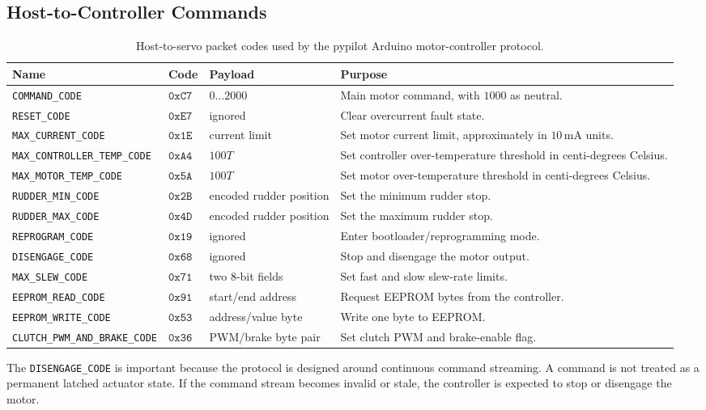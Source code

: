 \documentclass[10pt,twocolumn]{article}
\begin{document}
\subsection{Host-to-Controller Commands}
\begin{table}[!tbp]
\centering
\caption{Host-to-servo packet codes used by the pypilot Arduino motor-controller protocol.}
\label{tab:pypilot-servo-host-codes}
\begin{tabularx}{\textwidth}{Z{0.24\textwidth}Z{0.10\textwidth}Z{0.20\textwidth}Y}
\toprule
Name & Code & Payload & Purpose \\
\midrule
\texttt{COMMAND\_CODE} &
\(\mathtt{0xC7}\) &
\(0\ldots 2000\) &
Main motor command, with \(1000\) as neutral. \\
\texttt{RESET\_CODE} &
\(\mathtt{0xE7}\) &
ignored &
Clear overcurrent fault state. \\
\texttt{MAX\_CURRENT\_CODE} &
\(\mathtt{0x1E}\) &
current limit &
Set motor current limit, approximately in \(10\,\mathrm{mA}\) units. \\
\texttt{MAX\_CONTROLLER\_TEMP\_CODE} &
\(\mathtt{0xA4}\) &
\(100T\) &
Set controller over-temperature threshold in centi-degrees Celsius. \\
\texttt{MAX\_MOTOR\_TEMP\_CODE} &
\(\mathtt{0x5A}\) &
\(100T\) &
Set motor over-temperature threshold in centi-degrees Celsius. \\
\texttt{RUDDER\_MIN\_CODE} &
\(\mathtt{0x2B}\) &
encoded rudder position &
Set the minimum rudder stop. \\
\texttt{RUDDER\_MAX\_CODE} &
\(\mathtt{0x4D}\) &
encoded rudder position &
Set the maximum rudder stop. \\
\texttt{REPROGRAM\_CODE} &
\(\mathtt{0x19}\) &
ignored &
Enter bootloader/reprogramming mode. \\
\texttt{DISENGAGE\_CODE} &
\(\mathtt{0x68}\) &
ignored &
Stop and disengage the motor output. \\
\texttt{MAX\_SLEW\_CODE} &
\(\mathtt{0x71}\) &
two 8-bit fields &
Set fast and slow slew-rate limits. \\
\texttt{EEPROM\_READ\_CODE} &
\(\mathtt{0x91}\) &
start/end address &
Request EEPROM bytes from the controller. \\
\texttt{EEPROM\_WRITE\_CODE} &
\(\mathtt{0x53}\) &
address/value byte &
Write one byte to EEPROM. \\
\texttt{CLUTCH\_PWM\_AND\_BRAKE\_CODE} &
\(\mathtt{0x36}\) &
PWM/brake byte pair &
Set clutch PWM and brake-enable flag. \\
\bottomrule
\end{tabularx}
\end{table}
The \texttt{DISENGAGE\_CODE} is important because the protocol is
designed around continuous command streaming.  A command is not treated as
a permanent latched actuator state.  If the command stream becomes invalid
or stale, the controller is expected to stop or disengage the motor.
\end{document}
